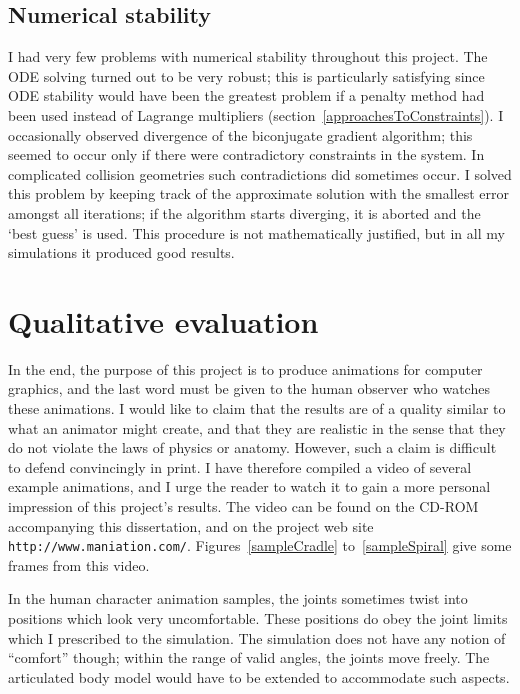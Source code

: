 \subsection{Numerical stability}

I had very few problems with numerical stability throughout this project. The ODE solving turned
out to be very robust; this is particularly satisfying since ODE stability would have been the
greatest problem if a penalty method had been used instead of Lagrange multipliers
(section~\ref{approachesToConstraints}). I occasionally observed divergence of the biconjugate
gradient algorithm; this seemed to occur only if there were contradictory constraints in the
system. In complicated collision geometries such contradictions did sometimes occur. I solved this
problem by keeping track of the approximate solution with the smallest error amongst all
iterations; if the algorithm starts diverging, it is aborted and the `best guess' is used.
This procedure is not mathematically justified, but in all my simulations it produced good results.

\enlargethispage{20pt}
\section{Qualitative evaluation}

In the end, the purpose of this project is to produce animations for computer graphics, and the
last word must be given to the human observer who watches these animations. I would like to claim
that the results are of a quality similar to what an animator might create, and that they are
realistic in the sense that they do not violate the laws of physics or anatomy. However, such a
claim is difficult to defend convincingly in print. I have therefore compiled a video of several
example animations, and I urge the reader to watch it to gain a more personal impression of this
project's results. The video can be found on the CD-ROM accompanying this dissertation, and on the
project web site \texttt{http://www.maniation.com/}. Figures~\ref{sampleCradle}
to~\ref{sampleSpiral} give some frames from this video.

In the human character animation samples, the joints sometimes twist into positions which look
very uncomfortable. These positions do obey the joint limits which I prescribed to the simulation.
The simulation does not have any notion of ``comfort'' though; within the range of valid angles,
the joints move freely. The articulated body model would have to be extended to accommodate such
aspects.

